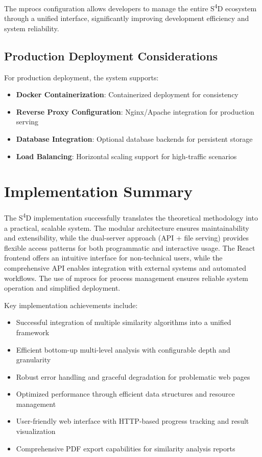 The mprocs configuration allows developers to manage the entire S\textsuperscript{4}D ecosystem through a unified interface, significantly improving development efficiency and system reliability.

\subsection{Production Deployment Considerations}
For production deployment, the system supports:

\begin{itemize}
    \item \textbf{Docker Containerization}: Containerized deployment for consistency
    \item \textbf{Reverse Proxy Configuration}: Nginx/Apache integration for production serving
    \item \textbf{Database Integration}: Optional database backends for persistent storage
    \item \textbf{Load Balancing}: Horizontal scaling support for high-traffic scenarios
\end{itemize}

\section{Implementation Summary}
\label{sec:implementation-summary}

The S\textsuperscript{4}D implementation successfully translates the theoretical methodology into a practical, scalable system. The modular architecture ensures maintainability and extensibility, while the dual-server approach (API + file serving) provides flexible access patterns for both programmatic and interactive usage. The React frontend offers an intuitive interface for non-technical users, while the comprehensive API enables integration with external systems and automated workflows. The use of mprocs for process management ensures reliable system operation and simplified deployment.

Key implementation achievements include:
\begin{itemize}
    \item Successful integration of multiple similarity algorithms into a unified framework
    \item Efficient bottom-up multi-level analysis with configurable depth and granularity
    \item Robust error handling and graceful degradation for problematic web pages
    \item Optimized performance through efficient data structures and resource management
    \item User-friendly web interface with HTTP-based progress tracking and result visualization
    \item Comprehensive PDF export capabilities for similarity analysis reports
\end{itemize} 